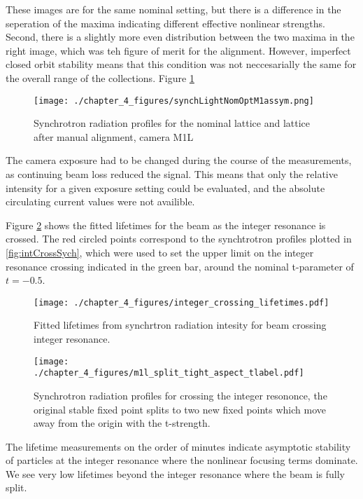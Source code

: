 These images are for the same nominal setting, but there is a difference in the seperation of the maxima indicating different effective nonlinear strengths. Second, there is a slightly more even distribution between the two maxima in the right image, which was teh figure of merit for the alignment. However, imperfect closed orbit stability means that this condition was not neccesarially the same for the overall range of the collections. Figure \ref{fig:synchAssym} 

\begin{figure}
	\centering
	\texttt{[image: ./chapter\_4\_figures/synchLightNomOptM1assym.png]}
	\caption{Synchrotron radiation profiles for the nominal lattice and lattice after manual alignment, camera M1L}
	\label{fig:synchAssym}
\end{figure}

The camera exposure had to be changed during the course of the measurements, as continuing beam loss reduced the signal. This means that only the relative intensity for a given exposure setting could be evaluated, and the absolute circulating current values were not availible.

Figure \ref{fig:synchLife} shows the fitted lifetimes for the beam as the integer resonance is crossed. The red circled points correspond to the synchtrotron profiles plotted in \ref{fig:intCrossSych}, which were used to set the upper limit on the integer resonance crossing indicated in the green bar, around the nominal t-parameter of $t=-0.5$. 

\begin{figure}
	\centering
	\texttt{[image: ./chapter\_4\_figures/integer\_crossing\_lifetimes.pdf]}
	\caption{Fitted lifetimes from synchrtron radiation intesity for beam crossing integer resonance.}
	\label{fig:synchLife}
\end{figure}

\begin{figure}
	\centering
	\texttt{[image: ./chapter\_4\_figures/m1l\_split\_tight\_aspect\_tlabel.pdf]}
	\caption{Synchrotron radiation profiles for crossing the integer resononce, the original stable fixed point splits to two new fixed points which move away from the origin with the t-strength.}
	\label{fig:intCrossSynch}
\end{figure}

The lifetime measurements on the order of minutes indicate asymptotic stability of particles at the integer resonance where the nonlinear focusing terms dominate. We see very low lifetimes beyond the integer resonance where the beam is fully split. 
